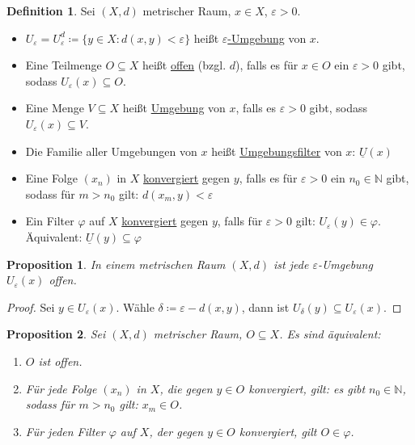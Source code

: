 \documentclass[12pt]{scrartcl}%
\newtheorem{prop}{Proposition}
\theoremstyle{definition}
\newtheorem*{defn}{Definition}
\theoremstyle{remark}
\begin{document}
\begin{defn}
    Sei $(X, d)$ metrischer Raum, $x\in X$, $\varepsilon > 0$.

    \begin{itemize}
        \item $U_\varepsilon=U_\varepsilon^d\coloneqq \{y\in X: d(x,y) < \varepsilon\}$ heißt \underline{$\varepsilon$-Umgebung} von $x$.
        \item Eine Teilmenge $O\subseteq X$ heißt \underline{offen} (bzgl. $d$), falls es für $x\in O$ ein $\varepsilon > 0$ gibt, sodass $U_\varepsilon(x)\subseteq O$.
        \item Eine Menge $V\subseteq X$ heißt \underline{Umgebung} von $x$, falls es $\varepsilon > 0$ gibt, sodass $U_\varepsilon(x)\subseteq V$.
        \item Die Familie aller Umgebungen von $x$ heißt \underline{Umgebungsfilter} von $x$: $\underline{U}(x)$
        \item Eine Folge $(x_n)$ in $X$ \underline{konvergiert} gegen $y$, falls es für $\varepsilon > 0$ ein $n_0\in \mathbb{N}$ gibt, sodass für $m > n_0$ gilt: $d(x_m, y) < \varepsilon$
        \item Ein Filter $\varphi$ auf $X$ \underline{konvergiert} gegen $y$, falls für $\varepsilon > 0$ gilt: $U_\varepsilon(y)\in\varphi$. Äquivalent: $\underline{U}(y)\subseteq \varphi$
    \end{itemize}
\end{defn}

\begin{prop}
    In einem metrischen Raum $(X, d)$ ist jede $\varepsilon$-Umgebung $U_\varepsilon(x)$ offen.
\end{prop}

\begin{proof}
    Sei $y\in U_\varepsilon(x)$. Wähle $\delta\coloneqq \varepsilon-d(x,y)$, dann ist $U_\delta(y)\subseteq U_\varepsilon(x)$.
\end{proof}

\begin{prop}
    Sei $(X, d)$ metrischer Raum, $O\subseteq X$. Es sind äquivalent:

    \begin{enumerate}[label=(\arabic*)]
        \item $O$ ist offen.
        \item Für jede Folge $(x_n)$ in $X$, die gegen $y\in O$ konvergiert, gilt: es gibt $n_0\in\mathbb{N}$, sodass für $m > n_0$ gilt: $x_m\in O$.
        \item Für jeden Filter $\varphi$ auf $X$, der gegen $y\in O$ konvergiert, gilt $O\in \varphi$.
    \end{enumerate}
\end{prop}
\end{document}
